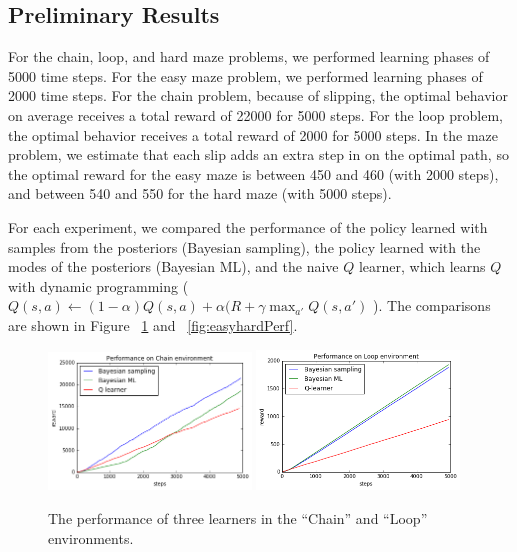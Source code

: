 \documentclass[10pt, twocolumn, twoside]{article}
\begin{document}
\subsection{Preliminary Results}
For the chain, loop, and hard maze problems, we performed learning phases of 5000 time steps. For
the easy maze problem, we performed learning phases of 2000 time steps. For the chain problem,
because of slipping, the optimal behavior on average receives a total reward of 22000 for
5000 steps. For the loop problem, the optimal behavior receives a total reward of 2000
for 5000 steps. In the maze problem, we estimate that each slip adds an extra step in on the optimal
path, so the optimal reward for the easy maze is between 450 and 460 (with 2000 steps),
and between 540 and 550 for the hard maze (with 5000 steps).

For each experiment, we compared the performance of the policy learned with samples from the posteriors
(Bayesian sampling), the policy learned with the modes of the posteriors (Bayesian ML), and the naive $Q$
learner, which learns $Q$ with dynamic programming (
$Q(s, a) \leftarrow (1 - \alpha)Q(s,a) + \alpha(R + \gamma \max_{a'}Q(s, a')$
). The comparisons are shown in Figure ~\ref{fig:chainloopPerf} and
~\ref{fig:easyhardPerf}.

\begin{figure}
\centering
\includegraphics[width=0.48\textwidth]{chainPerf.png}
\includegraphics[width=0.48\textwidth]{loopPerf.png}
\caption{\label{fig:chainloopPerf} The performance of three learners in the ``Chain'' and ``Loop''
environments.}
\end{figure}
\end{document}
